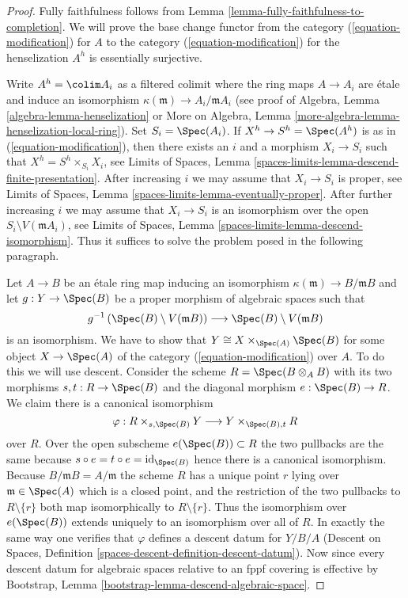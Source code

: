\begin{proof}
Fully faithfulness follows from
Lemma \ref{lemma-fully-faithfulness-to-completion}. We will prove the
base change functor from the category (\ref{equation-modification}) for $A$
to the category (\ref{equation-modification}) for the henselization $A^h$
is essentially surjective.

\medskip\noindent
Write $A^h = \colim A_i$ as a filtered colimit where the ring maps
$A \to A_i$ are \'etale and induce an isomorphism
$\kappa(\mathfrak m) \to A_i/\mathfrak m A_i$ (see proof of
Algebra, Lemma \ref{algebra-lemma-henselization} or
More on Algebra, Lemma \ref{more-algebra-lemma-henselization-local-ring}).
Set $S_i = \Spec(A_i)$.
If $X^h \to S^h = \Spec(A^h)$ is as in (\ref{equation-modification}),
then there exists an $i$ and a morphism $X_i \to S_i$ such that
$X^h = S^h \times_{S_i} X_i$, see
Limits of Spaces, Lemma \ref{spaces-limits-lemma-descend-finite-presentation}.
After increasing $i$ we may assume that $X_i \to S_i$ is
proper, see
Limits of Spaces, Lemma \ref{spaces-limits-lemma-eventually-proper}.
After further increasing $i$ we may assume that
$X_i \to S_i$ is an isomorphism over the open
$S_i \setminus V(\mathfrak m A_i)$, see
Limits of Spaces, Lemma \ref{spaces-limits-lemma-descend-isomorphism}.
Thus it suffices to solve the problem posed in the following paragraph.

\medskip\noindent
Let $A \to B$ be an \'etale ring map inducing an isomorphism
$\kappa(\mathfrak m) \to B/\mathfrak m B$ and let $g : Y \to \Spec(B)$
be a proper morphism of algebraic spaces such that
$$
g^{-1}\left(\Spec(B) \setminus V(\mathfrak m B)\right)
\longrightarrow
\Spec(B) \setminus V(\mathfrak m B)
$$
is an isomorphism.
We have to show that $Y \cong X \times_{\Spec(A)} \Spec(B)$
for some object $X \to \Spec(A)$ of the category (\ref{equation-modification})
over $A$. To do this we will use descent.
Consider the scheme $R = \Spec(B \otimes_A B)$ with its two morphisms
$s, t : R \to \Spec(B)$ and the diagonal morphism $e : \Spec(B) \to R$.
We claim there is a canonical isomorphism
$$
\varphi :
R \times_{s, \Spec(B)} Y
\longrightarrow
Y \times_{\Spec(B), t} R
$$
over $R$. Over the open subscheme $e(\Spec(B)) \subset R$ the two
pullbacks are the same because $s \circ e = t \circ e = \text{id}_{\Spec(B)}$
hence there is a canonical isomorphism. Because
$B/\mathfrak m B = A/\mathfrak m$ the scheme $R$ has a unique
point $r$ lying over $\mathfrak m \in \Spec(A)$ which is a closed point,
and the restriction of the two pullbacks to $R \setminus \{r\}$ both map
isomorphically to $R \setminus \{r\}$. Thus the isomorphism over
$e(\Spec(B))$ extends uniquely to an isomorphism over all of $R$.
In exactly the same way one verifies that $\varphi$ defines a descent
datum for $Y/B/A$ (Descent on Spaces, Definition
\ref{spaces-descent-definition-descent-datum}). Now since every
descent datum for algebraic spaces relative to an fppf covering
is effective by Bootstrap, Lemma \ref{bootstrap-lemma-descend-algebraic-space}.


\end{proof}
